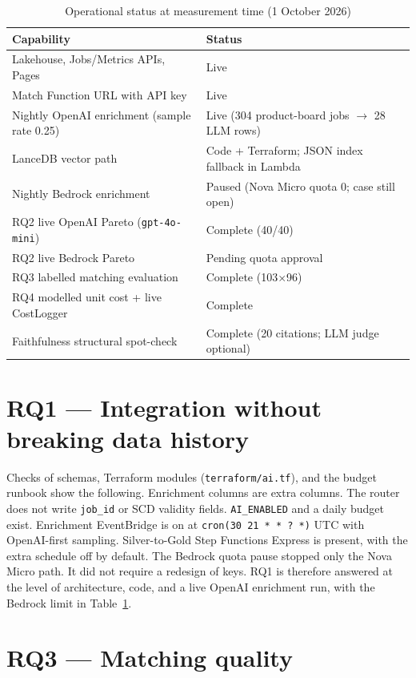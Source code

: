 \begin{table}[ht]
\centering
\caption{Operational status at measurement time (1 October 2026)}
\label{tab:status}
\begin{tabularx}{\textwidth}{@{}lX@{}}
\toprule
\textbf{Capability} & \textbf{Status} \\
\midrule
Lakehouse, Jobs/Metrics APIs, Pages & Live \\
Match Function URL with API key & Live \\
Nightly OpenAI enrichment (sample rate 0.25) & Live (304 product-board jobs $\rightarrow$ 28 LLM rows) \\
LanceDB vector path & Code + Terraform; JSON index fallback in Lambda \\
Nightly Bedrock enrichment & Paused (Nova Micro quota 0; case still open) \\
RQ2 live OpenAI Pareto (\texttt{gpt-4o-mini}) & Complete (40/40) \\
RQ2 live Bedrock Pareto & Pending quota approval \\
RQ3 labelled matching evaluation & Complete (103$\times$96) \\
RQ4 modelled unit cost + live CostLogger & Complete \\
Faithfulness structural spot-check & Complete (20 citations; LLM judge optional) \\
\bottomrule
\end{tabularx}
\end{table}

\section{RQ1 --- Integration without breaking data history}
\label{sec:rq1-results}

Checks of schemas, Terraform modules (\texttt{terraform/ai.tf}), and the budget runbook show the following. Enrichment columns are extra columns. The router does not write \texttt{job\_id} or SCD validity fields. \texttt{AI\_ENABLED} and a daily budget exist. Enrichment EventBridge is on at \texttt{cron(30 21 * * ? *)} UTC with OpenAI-first sampling. Silver-to-Gold Step Functions Express is present, with the extra schedule off by default. The Bedrock quota pause stopped only the Nova Micro path. It did not require a redesign of keys. RQ1 is therefore answered at the level of architecture, code, and a live OpenAI enrichment run, with the Bedrock limit in Table~\ref{tab:status}.

\section{RQ3 --- Matching quality}
\label{sec:rq3}

